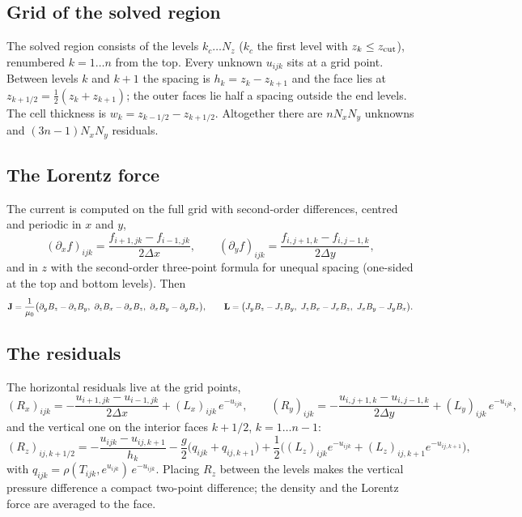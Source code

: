 \subsection{Grid of the solved region}
The solved region consists of the levels $k_c\dots N_z$ ($k_c$ the first level with $z_k\le z_{\rm cut}$), renumbered
$k=1\dots n$ from the top. Every unknown $u_{ijk}$ sits at a grid point. Between levels $k$ and $k+1$ the spacing is
$h_k=z_k-z_{k+1}$ and the face lies at $z_{k+1/2}=\tfrac12(z_k+z_{k+1})$; the outer faces lie half a spacing outside the
end levels. The cell thickness is $w_k=z_{k-1/2}-z_{k+1/2}$. Altogether there are $nN_xN_y$ unknowns and
$(3n-1)N_xN_y$ residuals.

\subsection{The Lorentz force}
The current is computed on the full grid with second-order differences, centred and periodic in $x$ and $y$,
\[
(\partial_xf)_{ijk}=\frac{f_{i+1,jk}-f_{i-1,jk}}{2\Delta x},\qquad (\partial_yf)_{ijk}=\frac{f_{i,j+1,k}-f_{i,j-1,k}}{2\Delta y},
\]
and in $z$ with the second-order three-point formula for unequal spacing (one-sided at the top and bottom levels). Then
\begin{equation}
\J=\frac1{\mu_0}\big(\partial_yB_z-\partial_zB_y,\ \partial_zB_x-\partial_xB_z,\ \partial_xB_y-\partial_yB_x\big),\qquad
\Lv=\big(J_yB_z-J_zB_y,\ J_zB_x-J_xB_z,\ J_xB_y-J_yB_x\big).
\end{equation}

\subsection{The residuals}
The horizontal residuals live at the grid points,
\begin{equation}
(R_x)_{ijk}=-\frac{u_{i+1,jk}-u_{i-1,jk}}{2\Delta x}+(L_x)_{ijk}\,e^{-u_{ijk}},\qquad
(R_y)_{ijk}=-\frac{u_{i,j+1,k}-u_{i,j-1,k}}{2\Delta y}+(L_y)_{ijk}\,e^{-u_{ijk}},\label{eq:Rxy}
\end{equation}
and the vertical one on the interior faces $k+1/2$, $k=1\dots n-1$:
\begin{equation}
(R_z)_{ij,k+1/2}=-\frac{u_{ijk}-u_{ij,k+1}}{h_k}-\frac{g}{2}\big(q_{ijk}+q_{ij,k+1}\big)
+\frac12\big((L_z)_{ijk}e^{-u_{ijk}}+(L_z)_{ij,k+1}e^{-u_{ij,k+1}}\big),\label{eq:Rz}
\end{equation}
with $q_{ijk}=\rho(T_{ijk},e^{u_{ijk}})\,e^{-u_{ijk}}$. Placing $R_z$ between the levels makes the vertical pressure
difference a compact two-point difference; the density and the Lorentz force are averaged to the face.

